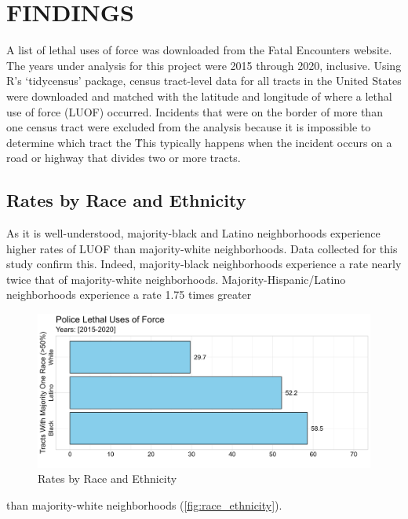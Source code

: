 \documentclass[12pt]{article}
\begin{document}
\section{FINDINGS}

A list of lethal uses of force was downloaded from the Fatal Encounters website. The years under analysis for this project were 2015 through 2020, inclusive. Using R’s ‘tidycensus’ package, census tract-level data for all tracts in the United States were downloaded and matched with the latitude and longitude of where a lethal use of force (LUOF) occurred. Incidents that were on the border of more than one census tract were excluded from the analysis because it is impossible to determine which tract the \. This typically happens when the incident occurs on a road or highway that divides two or more tracts.

\subsection{Rates by Race and Ethnicity}

As it is well-understood, majority-black and Latino neighborhoods experience higher rates of LUOF than majority-white neighborhoods. Data collected for this study confirm this. Indeed, majority-black neighborhoods experience a rate nearly twice that of majority-white neighborhoods. Majority-Hispanic/Latino neighborhoods experience a rate 1.75 times greater

\begin{figure}[H]
  \centering %
  \includegraphics[width=\linewidth]{images/majority_race_only_ind}
  \captionsetup{justification=centering, margin=2cm}
  \caption[Rates by Race and Ethnicity]{Rates by Race and Ethnicity}
  \label{fig:race_ethnicity}
\end{figure}

\noindent{}than majority-white neighborhoods (\autoref{fig:race_ethnicity}).
\end{document}
